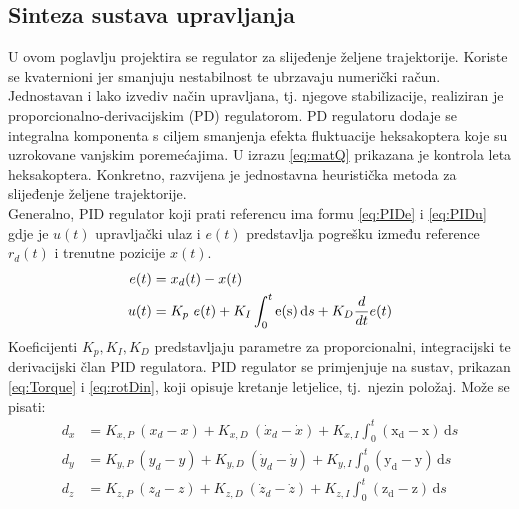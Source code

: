\documentclass[times, utf8, diplomski]{fer}
\begin{document}
\subsection{Sinteza sustava upravljanja}
U ovom poglavlju projektira se regulator za slijeđenje željene trajektorije. Koriste se kvaternioni jer smanjuju nestabilnost te ubrzavaju numerički račun. Jednostavan i lako izvediv način upravljana, tj. njegove stabilizacije, realiziran je proporcionalno-derivacijskim (PD) regulatorom. PD regulatoru dodaje se integralna komponenta s ciljem smanjenja efekta fluktuacije  heksakoptera koje su uzrokovane vanjskim poremećajima.
U izrazu \ref{eq:matQ} prikazana je kontrola leta heksakoptera. Konkretno, razvijena je jednostavna heuristička metoda za slijeđenje željene trajektorije. \\
Generalno, PID regulator koji prati referencu ima formu \ref{eq:PIDe} i \ref{eq:PIDu} gdje je $u(t)$ upravljački ulaz i $e(t)$ predstavlja pogrešku između reference $r_d(t)$ i trenutne pozicije $x(t)$.
\begin{align}
e(t) &= x_d(t) - x(t) \label{eq:PIDe} \\
u(t) &= K_p~e(t) + K_I \int_0^t {\mathrm{e(s)}\,\mathrm{d}s} + K_D {d\over dt} e(t) \label{eq:PIDu}
\end{align}
Koeficijenti $K_p, K_I, K_D$ predstavljaju parametre za proporcionalni, integracijski te derivacijski član PID regulatora. PID regulator se primjenjuje na sustav, prikazan \ref{eq:Torque} i \ref{eq:rotDin}, koji opisuje kretanje letjelice, tj.~njezin položaj. Može se pisati:
\begin{align}
d_x &= K_{x,P}~(x_d-x)+K_{x,D}~(\dot{x}_d-\dot{x})+K_{x,I} \int_0^t {\mathrm{(x_d-x)}\,\mathrm{d}s} \label{eq:PIDdy} \\
d_y &= K_{y,P}~(y_d-y)+K_{y,D}~(\dot{y}_d-\dot{y})+K_{y,I} \int_0^t {\mathrm{(y_d-y)}\,\mathrm{d}s} \label{eq:PIDdy} \\
d_z &= K_{z,P}~(z_d-z)+K_{z,D}~(\dot{z}_d-\dot{z})+K_{z,I} \int_0^t {\mathrm{(z_d-z)}\,\mathrm{d}s} \label{eq:PIDdy}
\end{align}
\end{document}

